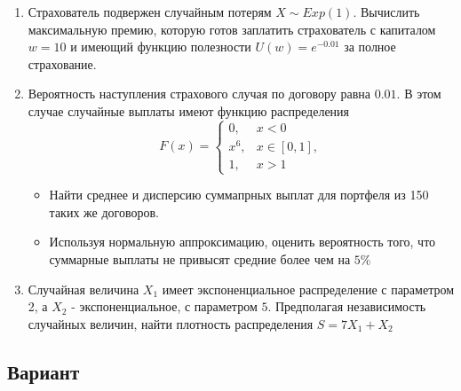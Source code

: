 \documentclass[12pt, letterpaper]{article}
\begin{document}
\begin{enumerate}
	\item 
	
	Страхователь подвержен случайным потерям $X \sim Exp(1)$.
	Вычислить максимальную премию, которую готов заплатить страхователь с капиталом $w=10$ и имеющий функцию полезности $U(w) = e^{-0.01}$ за полное страхование.
	
	
	\item
	Вероятность наступления страхового случая по договору равна $0.01$. В этом случае случайные выплаты имеют функцию распределения
	\[
	F(x) = 
	\begin{cases}
		0, & x < 0\\
		x^6, & x \in [0, 1],\\
		1, & x > 1
	\end{cases}
	\]
	\begin{itemize}
		\item Найти среднее и дисперсию суммапрных выплат для портфеля из 150 таких же договоров.
		\item Используя нормальную аппроксимацию, оценить вероятность того, что суммарные выплаты не привысят средние более чем на $5\%$
	\end{itemize}
	
	\item
	Случайная величина $X_1$ имеет экспоненциальное распределение с параметром 2, а $X_2$ - экспоненциальное, с параметром $5$.
	Предполагая независимость случайных величин, найти плотность распределения $S = 7X_1 + X_2$
\end{enumerate}


\newpage
\begin{center}
	\section{Вариант}
\end{center}
\end{document}
